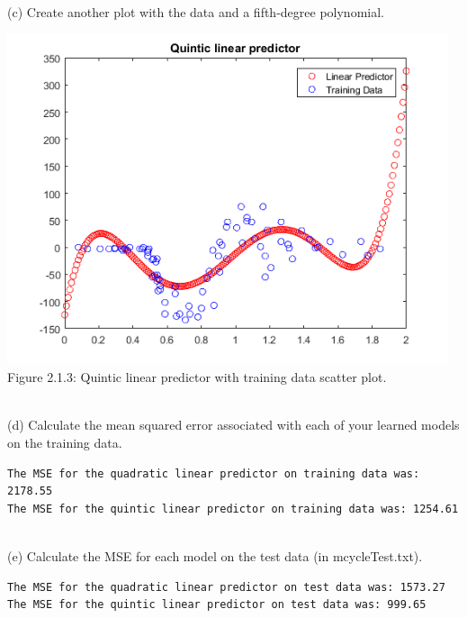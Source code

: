 \documentclass[]{report}   %
\begin{document}
~\\ 
(c) Create another plot with the data and a fifth-degree polynomial.
\begin{center}
	\includegraphics[width=35em]{2_1_Figure_3.png}
	{Figure 2.1.3: Quintic linear predictor with training data scatter plot.}
\end{center}
~\\
(d) Calculate the mean squared error associated with each of your learned models on the training
data.
\begin{lstlisting}[caption=Matlab output for MSE calculations on training data.]
The MSE for the quadratic linear predictor on training data was: 2178.55
The MSE for the quintic linear predictor on training data was: 1254.61
\end{lstlisting}
~\\
(e) Calculate the MSE for each model on the test data (in mcycleTest.txt).
\begin{lstlisting}[caption=Matlab output for MSE calculations on test data.]
The MSE for the quadratic linear predictor on test data was: 1573.27
The MSE for the quintic linear predictor on test data was: 999.65
\end{lstlisting}
\end{document}
